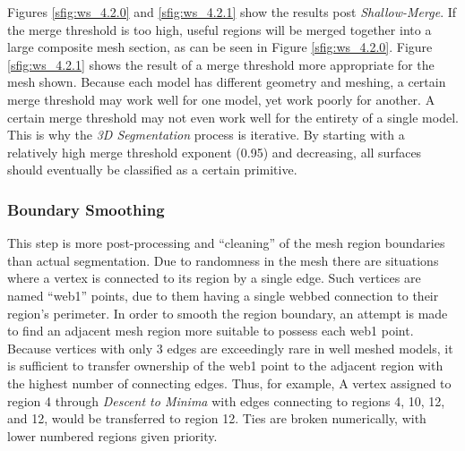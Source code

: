 Figures \ref{sfig:ws_4.2.0} and \ref{sfig:ws_4.2.1} show the results post \textit{Shallow-Merge}.
If the merge threshold is too high, useful regions will be merged together into a large composite mesh section, as can be seen in Figure \ref{sfig:ws_4.2.0}.
Figure \ref{sfig:ws_4.2.1} shows the result of a merge threshold more appropriate for the mesh shown.
Because each model has different geometry and meshing, a certain merge threshold may work well for one model, yet work poorly for another.
A certain merge threshold may not even work well for the entirety of a single model.
This is why the \textit{3D Segmentation} process is iterative.
By starting with a relatively high merge threshold exponent (0.95) and decreasing, all surfaces should eventually be classified as a certain primitive.

\subsubsection{Boundary Smoothing}
This step is more post-processing and ``cleaning'' of the mesh region boundaries than actual segmentation.
Due to randomness in the mesh there are situations where a vertex is connected to its region by a single edge.
Such vertices are named ``web1'' points, due to them having a single webbed connection to their region's perimeter.
In order to smooth the region boundary, an attempt is made to find an adjacent mesh region more suitable to possess each web1 point.
Because vertices with only 3 edges are exceedingly rare in well meshed models, it is sufficient to transfer ownership of the web1 point to the adjacent region with the highest number of connecting edges.
Thus, for example, A vertex assigned to region 4 through \textit{Descent to Minima} with edges connecting to regions 4, 10, 12, and 12, would be transferred to region 12.
Ties are broken numerically, with lower numbered regions given priority.


